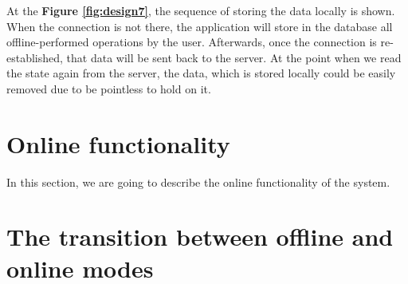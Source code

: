 At the \textbf{Figure \ref{fig:design7}}, the sequence of storing the data locally is shown. When the connection is not there, the application will store in the database all offline-performed operations by the user. Afterwards, once the connection is re-established, that data will be sent back to the server. At the point when we read the state again from the server, the data, which is stored locally could be easily removed due to be pointless to hold on it. 


\section {Online functionality}

In this section, we are going to describe the online functionality of the system.



\section {The transition between offline and online modes}